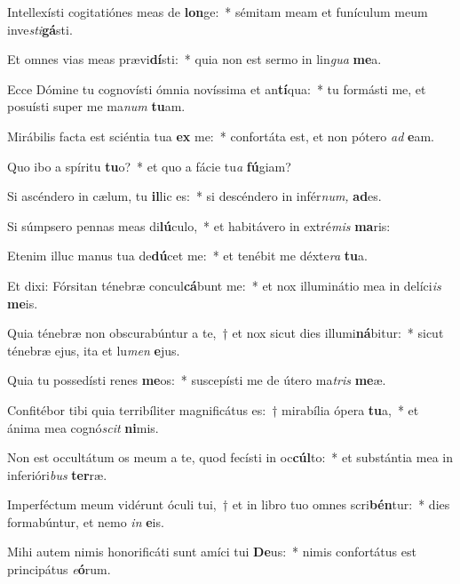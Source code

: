 \item Intellexísti cogitatiónes meas de \textbf{lon}ge:~* sémitam meam et funículum meum inve\hspace*{0.03em}\textit{sti}\textbf{gá}sti.
\item Et omnes vias meas prævi\textbf{dí}sti:~* quia non est sermo in lin\textit{gua} \textbf{me}a.
\item Ecce Dómine tu cognovísti ómnia novíssima et an\textbf{tí}qua:~* tu formásti me, et posuísti super me ma\hspace*{0.01em}\textit{num} \textbf{tu}am.
\item Mirábilis facta est sciéntia tua \textbf{ex} me:~* confortáta est, et non pótero \textit{ad} \textbf{e}am.
\item Quo ibo a spíritu \textbf{tu}o?~* et quo a fácie tu\hspace*{0.03em}\textit{a} \textbf{fú}giam?
\item Si ascéndero in cælum, tu \textbf{il}lic es:~* si descéndero in infér\textit{num,} \textbf{ad}es.
\item Si súmpsero pennas meas di\textbf{lú}culo,~* et habitávero in extré\textit{mis} \textbf{ma}ris:
\item Etenim illuc manus tua de\textbf{dú}cet me:~* et tenébit me déxte\textit{ra} \textbf{tu}a.
\item Et dixi: Fórsitan ténebræ concul\textbf{cá}bunt me:~* et nox illuminátio mea in delíci\textit{is} \textbf{me}is.
\item Quia ténebræ non obscurabúntur a te,~† et nox sicut dies illumi\textbf{ná}bitur:~* sicut ténebræ ejus, ita et lu\textit{men} \textbf{e}jus.
\item Quia tu possedísti renes \textbf{me}os:~* suscepísti me de útero ma\hspace*{0.03em}\textit{tris} \textbf{me}æ.
\item Confitébor tibi quia terribíliter magnificátus es:~† mirabília ópera \textbf{tu}a,~* et ánima mea cognó\hspace*{0.03em}\textit{scit} \textbf{ni}mis.
\item Non est occultátum os meum a te, quod fecísti in oc\textbf{cúl}to:~* et substántia mea in inferióri\textit{bus} \textbf{ter}ræ.
\item Imperféctum meum vidérunt óculi tui,~† et in libro tuo o\-mnes scri\textbf{bén}tur:~* dies formabúntur, et nemo \textit{in} \textbf{e}is.
\item Mihi autem nimis honorificáti sunt amíci tui \textbf{De}us:~* nimis confortátus est principátus \textit{e}\textbf{ó}rum.
